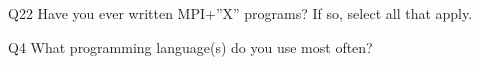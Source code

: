 \begin{description}%
\item{Q22} Have you ever written MPI+”X” programs? If so, select all that apply.%
\item{Q4} What programming language(s) do you use most often?%
\end{description}%

